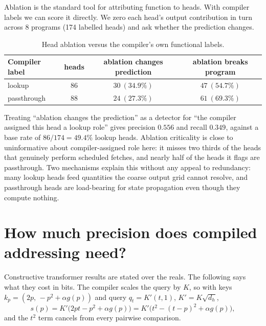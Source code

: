 \documentclass{article}
\theoremstyle{definition}
\begin{document}
Ablation is the standard tool for attributing function to heads. With compiler
labels we can score it directly. We zero each head's output contribution in turn
across 8 programs (174 labelled heads) and ask whether the prediction changes.

\begin{table}[t]
\caption{Head ablation versus the compiler's own functional labels.}
\label{tab:ablation}
\begin{center}
\begin{tabular}{lccc}
\toprule
Compiler label & heads & ablation changes prediction & ablation breaks program \\
\midrule
lookup      & $86$ & $30\ (34.9\%)$ & $47\ (54.7\%)$ \\
passthrough & $88$ & $24\ (27.3\%)$ & $61\ (69.3\%)$ \\
\bottomrule
\end{tabular}
\end{center}
\end{table}

Treating ``ablation changes the prediction'' as a detector for ``the compiler
assigned this head a lookup role'' gives precision $0.556$ and recall $0.349$,
against a base rate of $86/174=49.4\%$ lookup heads. Ablation criticality is
close to uninformative about compiler-assigned role here: it misses two thirds of
the heads that genuinely perform scheduled fetches, and nearly half of the heads
it flags are passthrough. Two mechanisms explain this without any appeal to
redundancy: many lookup heads feed quantities the coarse output grid cannot
resolve, and passthrough heads are load-bearing for state propagation even though
they compute nothing.

\section{How much precision does compiled addressing need?}\label{sec:precision}

Constructive transformer results are stated over the reals. The following says
what they cost in bits. The compiler scales the query by $K$, so with keys
$k_p=(2p,\,-p^2+\alpha g(p))$ and query $q_t=K'(t,1)$, $K'=K\sqrt{d_h}$,
\[
s(p) = K'\bigl(2pt-p^2+\alpha g(p)\bigr)
     = K'\bigl(t^2-(t-p)^2+\alpha g(p)\bigr),
\]
and the $t^2$ term cancels from every pairwise comparison.
\end{document}

